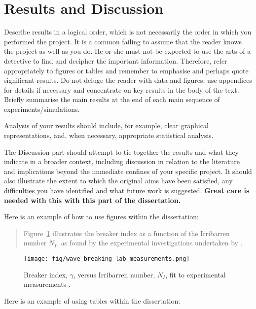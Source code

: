 \documentclass[a4paper,12pt]{article}
\begin{document}
\section{Results and Discussion}
\label{sec:results-discussion}

Describe results in a logical order, which is not necessarily the order in which you performed the project. It is a common failing to assume that the reader knows the project as well as you do. He or she must not be expected to use the arts of a detective to find and decipher the important information. Therefore, refer appropriately to figures or tables and remember to emphasise and perhaps quote significant results. Do not deluge the reader with data and figures; use appendices for details if necessary and concentrate on key results in the body of the text. Briefly summarise the main results at the end of each main sequence of experiments/simulations.

Analysis of your results should include, for example, clear graphical representations, and, when necessary, appropriate statistical analysis.

The Discussion part should attempt to tie together the results and what they indicate in a broader
context, including discussion in relation to the literature and implications beyond the immediate
confines of your specific project. It should also illustrate the extent to which the original aims
have been satisfied, any difficulties you have identified and what future work is suggested.
\textbf{Great care is needed with this with this part of the dissertation.} 

\clearpage

Here is an example of how to use figures within the dissertation:

\begin{quote}
  Figure~\ref{fig:wave_breaking_lab_measurements} illustrates the breaker index as a function of the
  Irribarren number $N_I$, as found by the experimental investigations undertaken by
  \citet{Battjes1974}.
\end{quote}

\begin{figure}[!h]
  \centering
  \texttt{[image: fig/wave\_breaking\_lab\_measurements.png]}
  \caption{Breaker index, $\gamma$, versus Irribarren number, $N_I$, fit to experimental measurements \citep{Battjes1974}.}
  \label{fig:wave_breaking_lab_measurements}
\end{figure}

Here is an example of using tables within the dissertation:
\end{document}

